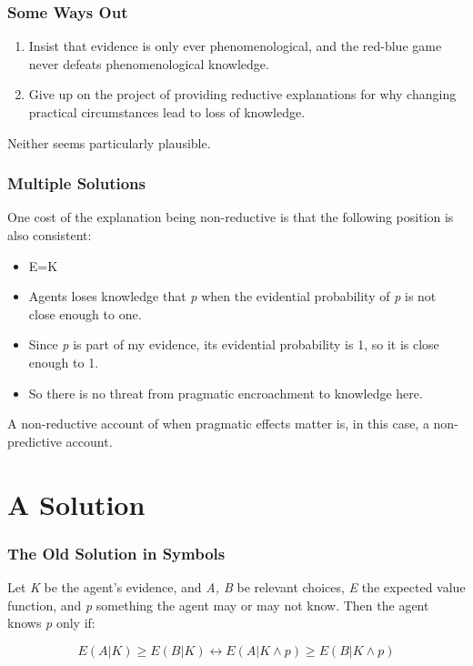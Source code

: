 \begin{frame}

\frametitle{Some Ways Out}
\label{somewaysout}

\begin{enumerate}
\item Insist that evidence is only ever phenomenological, and the red-blue game never defeats phenomenological knowledge.

\item Give up on the project of providing reductive explanations for why changing practical circumstances lead to loss of knowledge.

\end{enumerate}
Neither seems particularly plausible.

\end{frame}

\begin{frame}

\frametitle{Multiple Solutions}
\label{multiplesolutions}

One cost of the explanation being non-reductive is that the following position is also consistent:

\begin{itemize}
\item E=K

\item Agents loses knowledge that \emph{p} when the evidential probability of \emph{p} is not close enough to one.

\item Since \emph{p} is part of my evidence, its evidential probability is 1, so it is close enough to 1.

\item So there is no threat from pragmatic encroachment to knowledge here.

\end{itemize}
A non-reductive account of when pragmatic effects matter is, in this case, a non-predictive account.

\end{frame}

\section{A Solution}
\label{asolution}

\begin{frame}

\frametitle{The Old Solution in Symbols}
\label{theoldsolutioninsymbols}

Let \emph{K} be the agent's evidence, and \emph{A, B} be relevant choices, \emph{E} the expected value function, and \emph{p} something the agent may or may not know. Then the agent knows \emph{p} only if:


\begin{equation*}
E(A | K) \geq E(B | K) \leftrightarrow E(A | K \wedge p) \geq E(B | K \wedge p)
\end{equation*}
\end{frame}

